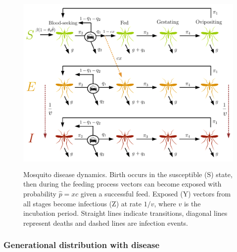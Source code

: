 \begin{figure}[ht]
\begin{center}
\includegraphics[height=9cm]{Project/Figures/VectorModel/Diagram_SEI2019.pdf}
\caption[Mosquito disease model schematic.]{Mosquito disease dynamics. Birth occurs in the susceptible (S) state, then during the feeding process vectors can become exposed with probability $\hat{p}=xc$ given a successful feed. Exposed (Y) vectors from all stages become infectious (Z) at rate $1/v$, where $v$ is the incubation period. Straight lines indicate transitions, diagonal lines represent deaths and dashed lines are infection events.}
\label{fig:diag_vec_SEI}
\end{center}
\end{figure}

\subsubsection{Generational distribution with disease}



